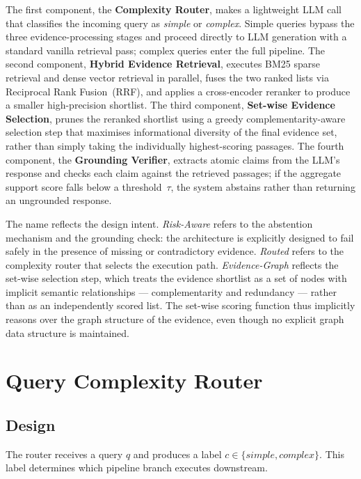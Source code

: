 The first component, the \textbf{Complexity Router}, makes a lightweight LLM
call that classifies the incoming query as \emph{simple} or \emph{complex}.
Simple queries bypass the three evidence-processing stages and proceed directly
to LLM generation with a standard vanilla retrieval pass; complex queries enter
the full pipeline.
The second component, \textbf{Hybrid Evidence Retrieval}, executes BM25 sparse
retrieval and dense vector retrieval in parallel, fuses the two ranked lists via
Reciprocal Rank Fusion~(RRF), and applies a cross-encoder reranker to produce a
smaller high-precision shortlist.
The third component, \textbf{Set-wise Evidence Selection}, prunes the reranked
shortlist using a greedy complementarity-aware selection step that maximises
informational diversity of the final evidence set, rather than simply taking the
individually highest-scoring passages.
The fourth component, the \textbf{Grounding Verifier}, extracts atomic claims from
the LLM's response and checks each claim against the retrieved passages; if the
aggregate support score falls below a threshold~$\tau$, the system abstains rather
than returning an ungrounded response.

The name reflects the design intent.
\emph{Risk-Aware} refers to the abstention mechanism and the grounding check:
the architecture is explicitly designed to fail safely in the presence of
missing or contradictory evidence.
\emph{Routed} refers to the complexity router that selects the execution path.
\emph{Evidence-Graph} reflects the set-wise selection step, which treats the
evidence shortlist as a set of nodes with implicit semantic relationships ---
complementarity and redundancy --- rather than as an independently scored list.
The set-wise scoring function thus implicitly reasons over the graph structure
of the evidence, even though no explicit graph data structure is maintained.

\section{Query Complexity Router}
\label{sec:router}

\subsection{Design}

The router receives a query $q$ and produces a label
$c \in \{\textit{simple}, \textit{complex}\}$.
This label determines which pipeline branch executes downstream.

